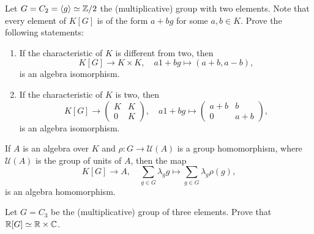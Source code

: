 \begin{exercise}
	Let $G=C_2=\langle g\rangle\simeq\mathbb{Z}/2$ the (multiplicative) 
	group with two elements. Note that every element of $K[G]$ is of the form
	$a+bg$ for some $a,b\in K$. Prove the following statements:
	\begin{enumerate}
	    \item If the characteristic of $K$ is different from two, then 
	    \[
		K[G]\to K\times K,
		\quad
		a1+bg\mapsto (a+b,a-b),
	\]
	is an algebra isomorphism. 
	\item If the characteristic of $K$ is two, then 
	\[
	K[G]\to \begin{pmatrix}
			K & K\\
			0 & K
		\end{pmatrix},
		\quad
		a1+bg\mapsto\begin{pmatrix}
			a+b & b\\
			0 & a+b
		\end{pmatrix},
	\]
	is an algebra isomorphism. 
	\end{enumerate}
\end{exercise}

If $A$ is an algebra over $K$ and $\rho\colon G\to \mathcal{U}(A)$
is a group homomorphism, where $\mathcal{U}(A)$ is the group of units of $A$, then 
the map \[
	K[G]\to A,\quad 
\sum_{g\in G}\lambda_gg\mapsto\sum_{g\in G}\lambda_g\rho(g),
\]
is an algebra homomorphism. 

\begin{exercise}
	Let $G=C_3$ be the (multiplicative) group of three elements. Prove that
	$\mathbb{R}[G]\simeq\mathbb{R}\times\mathbb{C}$.
\end{exercise}

